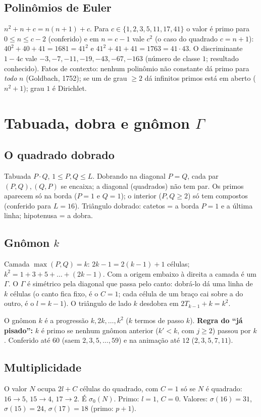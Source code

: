 \documentclass[11pt,a4paper]{article}
\begin{document}
\subsection{Polinômios de Euler}
$n^2+n+c=n(n+1)+c$. Para $c\in\{1,2,3,5,11,17,41\}$ o valor é primo para $0\le n\le c-2$ (conferido) e em $n=c-1$ vale $c^2$ (o caso do quadrado $c=n+1$): $40^2+40+41=1681=41^2$ e $41^2+41+41=1763=41\cdot43$. O discriminante $1-4c$ vale $-3,-7,-11,-19,-43,-67,-163$ (número de classe $1$; resultado conhecido). Fatos de contexto: nenhum polinômio não constante dá primo para \emph{todo} $n$ (Goldbach, 1752); se um de grau $\ge2$ dá infinitos primos está em aberto ($n^2+1$); grau $1$ é Dirichlet.

\section{Tabuada, dobra e gnômon $\Gamma$}

\subsection{O quadrado dobrado}
Tabuada $P\cdot Q$, $1\le P,Q\le L$. Dobrando na diagonal $P=Q$, cada par $(P,Q),(Q,P)$ se encaixa; a diagonal (quadrados) não tem par. Os primos aparecem só na borda ($P=1$ e $Q=1$); o interior ($P,Q\ge2$) só tem compostos (conferido para $L=16$). Triângulo dobrado: catetos = a borda $P=1$ e a última linha; hipotenusa = a dobra.

\subsection{Gnômon $k$}
Camada $\max(P,Q)=k$: $2k-1=2(k-1)+1$ células; $k^2=1+3+5+\dots+(2k-1)$. Com a origem embaixo à direita a camada é um $\Gamma$. O $\Gamma$ é simétrico pela diagonal que passa pelo canto: dobrá-lo dá uma linha de $k$ células (o canto fica fixo, é o $C=1$; cada célula de um braço cai sobre a do outro, é o $l=k-1$). O triângulo de lado $k$ desdobra em $2T_{k-1}+k=k^2$.

O gnômon $k$ é a progressão $k,2k,\dots,k^2$ ($k$ termos de passo $k$). \textbf{Regra do ``já pisado'':} $k$ é primo se nenhum gnômon anterior ($k'<k$, com $j\ge2$) passou por $k$. Conferido até $60$ (saem $2,3,5,\dots,59$) e na animação até $12$ ($2,3,5,7,11$).

\subsection{Multiplicidade}
O valor $N$ ocupa $2l+C$ células do quadrado, com $C=1$ só se $N$ é quadrado: $16\to5$, $15\to4$, $17\to2$. É $\sigma_0(N)$. Primo: $l=1$, $C=0$. Valores: $\sigma(16)=31$, $\sigma(15)=24$, $\sigma(17)=18$ (primo: $p+1$).
\end{document}
